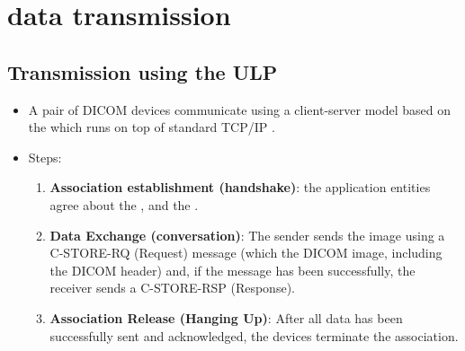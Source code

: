 \chapter{ data transmission}

\section{Transmission using the \gls{ULP}}
\begin{itemize}
\item A pair of \gls{DICOM} devices communicate using a client-server
  model based on the  which runs on top of standard TCP/IP \cite{DICOM_ULP}.
\item Steps:
  \begin{enumerate}
  \item \textbf{Association establishment (handshake)}: the
    application entities agree about the , and the
    .
  \item \textbf{Data Exchange (conversation)}: The sender sends the
    image using a C-STORE-RQ (Request) message (which the DICOM image,
    including the DICOM header) and, if the message has been
    successfully, the receiver sends a C-STORE-RSP (Response).
  \item \textbf{Association Release (Hanging Up)}: After all data has
    been successfully sent and acknowledged, the devices terminate the
    association.
  \end{enumerate}
\end{itemize}

